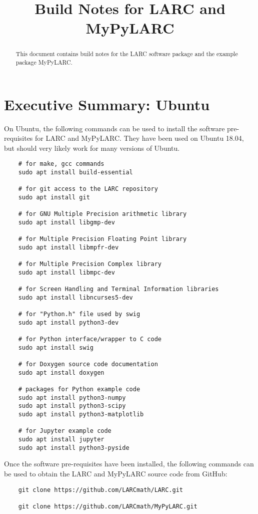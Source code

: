 \documentclass{article}
\title{Build Notes for LARC and MyPyLARC}
\begin{document}
\maketitle

\begin{abstract}
This document contains build notes for
the LARC software package and the
example package MyPyLARC.
\end{abstract}

\section{Executive Summary: Ubuntu}
On Ubuntu, the following commands can be used to install the
software pre-requisites for LARC and MyPyLARC.
They have been used on Ubuntu 18.04, but should very likely work
for many versions of Ubuntu.
\begin{verbatim}
    # for make, gcc commands
    sudo apt install build-essential

    # for git access to the LARC repository
    sudo apt install git

    # for GNU Multiple Precision arithmetic library
    sudo apt install libgmp-dev

    # for Multiple Precision Floating Point library
    sudo apt install libmpfr-dev

    # for Multiple Precision Complex library
    sudo apt install libmpc-dev

    # for Screen Handling and Terminal Information libraries
    sudo apt install libncurses5-dev

    # for "Python.h" file used by swig
    sudo apt install python3-dev

    # for Python interface/wrapper to C code
    sudo apt install swig

    # for Doxygen source code documentation
    sudo apt install doxygen

    # packages for Python example code
    sudo apt install python3-numpy
    sudo apt install python3-scipy
    sudo apt install python3-matplotlib

    # for Jupyter example code
    sudo apt install jupyter
    sudo apt install python3-pyside
\end{verbatim}

\noindent
Once the software pre-requisites have been installed, the
following commands can be used to obtain the LARC
and MyPyLARC source code from GitHub:
\begin{verbatim}
    git clone https://github.com/LARCmath/LARC.git

    git clone https://github.com/LARCmath/MyPyLARC.git
\end{verbatim}
\end{document}

